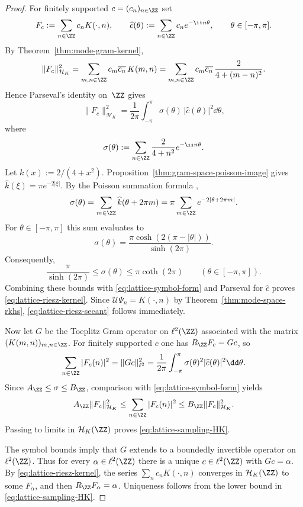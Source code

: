 \begin{proof}
For finitely supported $c=(c_n)_{n\in\ZZ}$ set
\[
F_c:=\sum_{n\in\ZZ}c_nK(\cdot,n),
\qquad
\widehat c(\theta):=\sum_{n\in\ZZ}c_ne^{-\ii n\theta},
\qquad
\theta\in[-\pi,\pi].
\]
By Theorem~\ref{thm:mode-gram-kernel},
\[
\|F_c\|_{\mathcal H_K}^2
=\sum_{m,n\in\ZZ}c_m\overline{c_n}\,K(m,n)
=\sum_{m,n\in\ZZ}c_m\overline{c_n}\,\frac{2}{4+(m-n)^2}.
\]
Hence Parseval's identity on~$\ZZ$ gives
\begin{equation}\label{eq:lattice-symbol-form}
\|F_c\|_{\mathcal H_K}^2
=\frac{1}{2\pi}\int_{-\pi}^{\pi}\sigma(\theta)\,
|\widehat c(\theta)|^2\dd\theta,
\end{equation}
where
\[
\sigma(\theta):=\sum_{n\in\ZZ}\frac{2}{4+n^2}e^{-\ii n\theta}.
\]
Let $k(x):=2/(4+x^2)$.  Proposition~\ref{thm:gram-space-poisson-image}
gives $\widehat k(\xi)=\pi e^{-2|\xi|}$.  By the Poisson summation formula
\cite[Chapter~III]{Stein1971},
\[
\sigma(\theta)=\sum_{m\in\ZZ}\widehat k(\theta+2\pi m)
=\pi\sum_{m\in\ZZ}e^{-2|\theta+2\pi m|}.
\]
For $\theta\in[-\pi,\pi]$ this sum evaluates to
\begin{equation}\label{eq:lattice-symbol}
\sigma(\theta)
=\frac{\pi\cosh(2(\pi-|\theta|))}{\sinh(2\pi)}.
\end{equation}
Consequently,
\[
\frac{\pi}{\sinh(2\pi)}
\le
\sigma(\theta)
\le
\pi\coth(2\pi)
\qquad(\theta\in[-\pi,\pi]).
\]
Combining these bounds with \eqref{eq:lattice-symbol-form} and Parseval
for $\widehat c$ proves \eqref{eq:lattice-riesz-kernel}.  Since
$\mathcal U\Psi_n=K(\cdot,n)$ by
Theorem~\ref{thm:mode-space-rkhs}, \eqref{eq:lattice-riesz-secant}
follows immediately.

Now let $G$ be the Toeplitz Gram operator on $\ell^2(\ZZ)$ associated
with the matrix $(K(m,n))_{m,n\in\ZZ}$.  For finitely supported $c$ one
has $R_{\ZZ}F_c=Gc$, so
\[
\sum_{n\in\ZZ}|F_c(n)|^2
=\|Gc\|_{\ell^2}^2
=\frac{1}{2\pi}\int_{-\pi}^{\pi}\sigma(\theta)^2
|\widehat c(\theta)|^2\dd\theta.
\]
Since $A_{\ZZ}\le \sigma\le B_{\ZZ}$, comparison with
\eqref{eq:lattice-symbol-form} yields
\[
A_{\ZZ}\|F_c\|_{\mathcal H_K}^2
\le
\sum_{n\in\ZZ}|F_c(n)|^2
\le
B_{\ZZ}\|F_c\|_{\mathcal H_K}^2.
\]
Passing to limits in $\mathcal H_K(\ZZ)$ proves
\eqref{eq:lattice-sampling-HK}.

The symbol bounds imply that $G$ extends to a boundedly invertible
operator on $\ell^2(\ZZ)$.  Thus for every $\alpha\in\ell^2(\ZZ)$ there is
a unique $c\in\ell^2(\ZZ)$ with $Gc=\alpha$.  By
\eqref{eq:lattice-riesz-kernel}, the series $\sum_n c_nK(\cdot,n)$
converges in $\mathcal H_K(\ZZ)$ to some $F_\alpha$, and then
$R_{\ZZ}F_\alpha=\alpha$.  Uniqueness follows from the lower bound in
\eqref{eq:lattice-sampling-HK}.
\end{proof}

